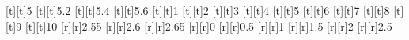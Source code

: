 %
\fontsize{8}{12}%
\selectfont%
%
[t][t]{5}%
[t][t]{5.2}%
[t][t]{5.4}%
[t][t]{5.6}%
[t][t]{1}%
[t][t]{2}%
[t][t]{3}%
[t][t]{4}%
[t][t]{5}%
[t][t]{6}%
[t][t]{7}%
[t][t]{8}%
[t][t]{9}%
[t][t]{10}%
%
[r][r]{2.55}%
[r][r]{2.6}%
[r][r]{2.65}%
[r][r]{0}%
[r][r]{0.5}%
[r][r]{1}%
[r][r]{1.5}%
[r][r]{2}%
[r][r]{2.5}%
%
%
